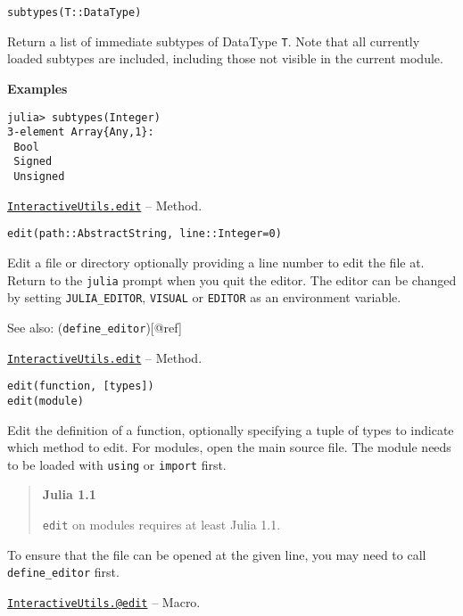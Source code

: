 \begin{adjustwidth}{2em}{0pt}


\begin{verbatim}
subtypes(T::DataType)
\end{verbatim}

Return a list of immediate subtypes of DataType \texttt{T}. Note that all currently loaded subtypes are included, including those not visible in the current module.

\textbf{Examples}


\begin{verbatim}
julia> subtypes(Integer)
3-element Array{Any,1}:
 Bool
 Signed
 Unsigned
\end{verbatim}



\end{adjustwidth}
\hypertarget{10268751953828531961}{} 
\hyperlink{10268751953828531961}{\texttt{InteractiveUtils.edit}}  -- {Method.}

\begin{adjustwidth}{2em}{0pt}


\begin{verbatim}
edit(path::AbstractString, line::Integer=0)
\end{verbatim}

Edit a file or directory optionally providing a line number to edit the file at. Return to the \texttt{julia} prompt when you quit the editor. The editor can be changed by setting \texttt{JULIA\_EDITOR}, \texttt{VISUAL} or \texttt{EDITOR} as an environment variable.

See also: (\texttt{define\_editor})[@ref]



\end{adjustwidth}
\hypertarget{5817135015306723574}{} 
\hyperlink{5817135015306723574}{\texttt{InteractiveUtils.edit}}  -- {Method.}

\begin{adjustwidth}{2em}{0pt}


\begin{verbatim}
edit(function, [types])
edit(module)
\end{verbatim}

Edit the definition of a function, optionally specifying a tuple of types to indicate which method to edit. For modules, open the main source file. The module needs to be loaded with \texttt{using} or \texttt{import} first.

\begin{quote}
\textbf{Julia 1.1}

\texttt{edit} on modules requires at least Julia 1.1.

\end{quote}
To ensure that the file can be opened at the given line, you may need to call \texttt{define\_editor} first.



\end{adjustwidth}
\hypertarget{15808508619915684107}{} 
\hyperlink{15808508619915684107}{\texttt{InteractiveUtils.@edit}}  -- {Macro.}

